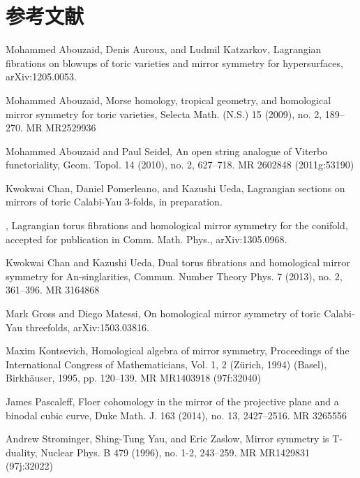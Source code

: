 
\section*{参考文献}

\begin{list}{}{%
  \setlength{\leftmargin}{5.4em}%
  \setlength{\labelwidth}{4.8em}%
  \setlength{\labelsep}{0.6em}%
  \setlength{\itemsep}{1.5pt}%
  \setlength{\parsep}{0pt}}
\item[{[AAK]}] Mohammed Abouzaid, Denis Auroux, and Ludmil Katzarkov, Lagrangian
  fibrations on blowups of toric varieties and mirror symmetry for hypersurfaces,
  arXiv:1205.0053.
\item[{[Abo09]}] Mohammed Abouzaid, Morse homology, tropical geometry, and homological
  mirror symmetry for toric varieties, Selecta Math. (N.S.) 15 (2009), no. 2, 189--270.
  MR MR2529936
\item[{[AS10]}] Mohammed Abouzaid and Paul Seidel, An open string analogue of Viterbo
  functoriality, Geom. Topol. 14 (2010), no. 2, 627--718. MR 2602848 (2011g:53190)
\item[{[CPUa]}] Kwokwai Chan, Daniel Pomerleano, and Kazushi Ueda, Lagrangian sections
  on mirrors of toric Calabi-Yau 3-folds, in preparation.
\item[{[CPUb]}] , Lagrangian torus fibrations and homological mirror symmetry for the
  conifold, accepted for publication in Comm. Math. Phys., arXiv:1305.0968.
\item[{[CU13]}] Kwokwai Chan and Kazushi Ueda, Dual torus fibrations and homological
  mirror symmetry for An-singlarities, Commun. Number Theory Phys. 7 (2013), no. 2,
  361--396. MR 3164868
\item[{[GM]}] Mark Gross and Diego Matessi, On homological mirror symmetry of toric
  Calabi-Yau threefolds, arXiv:1503.03816.
\item[{[Kon95]}] Maxim Kontsevich, Homological algebra of mirror symmetry, Proceedings
  of the International Congress of Mathematicians, Vol. 1, 2 (Z\"urich, 1994) (Basel),
  Birkh\"auser, 1995, pp. 120--139. MR MR1403918 (97f:32040)
\item[{[Pas14]}] James Pascaleff, Floer cohomology in the mirror of the projective plane
  and a binodal cubic curve, Duke Math. J. 163 (2014), no. 13, 2427--2516. MR 3265556
\item[{[SYZ96]}] Andrew Strominger, Shing-Tung Yau, and Eric Zaslow, Mirror symmetry
  is T-duality, Nuclear Phys. B 479 (1996), no. 1-2, 243--259. MR MR1429831 (97j:32022)
\end{list}

